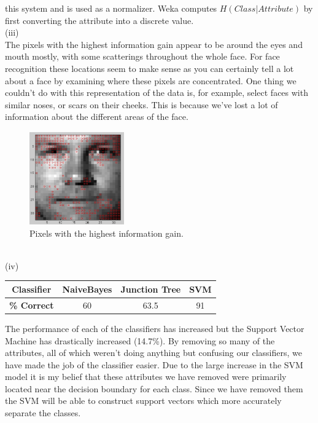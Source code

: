 \documentclass{report}
\begin{document}
this system and is used as a normalizer. Weka computes
$H(Class|Attribute)$ by first converting the attribute into a discrete
value.\\
(iii)\\
The pixels with the highest information gain appear to be around the
eyes and mouth mostly, with some scatterings throughout the whole
face. For face
recognition these locations seem to make sense as you can certainly
tell a lot about a face by examining where these pixels are concentrated. One
thing we couldn't do with this representation of the data is, for
example, select faces with similar noses, or scars on their
cheeks. This is because we've lost a lot of information about the
different areas of the face.\\
\begin{figure}[h]
  \centering
  \includegraphics[height=40mm]{images/BiiiFace.jpg}
  \caption{Pixels with the highest information gain.}
  \label{fig}
\end{figure}\\
(iv)\\
\begin{center}
  \begin{tabular}{|c|c|c|c|}
    \hline
    {\bf Classifier} & {\bf NaiveBayes} & {\bf Junction Tree} & {\bf SVM}\\
    \hline
    {\bf \% Correct} & 60 & 63.5 & 91\\
    \hline
  \end{tabular}
\end{center}
The performance of each of the classifiers has increased but the
Support Vector Machine has drastically increased (14.7\%). By removing so
many of the attributes, all of which weren't doing anything but
confusing our classifiers, we have made the job of the classifier
easier. Due to the large increase in the SVM model it is my belief that
these attributes we have removed were primarily located near the
decision boundary for each class. Since we have removed them the SVM
will be able to construct support vectors which more accurately
separate the classes.\\
\end{document}
